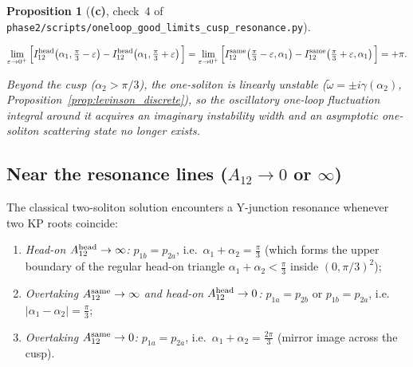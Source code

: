 \documentclass[11pt,a4paper]{article}
\newcommand{\Lc}{\textsf{\textbf{(c)}}}
\newcommand{\script}[1]{\texttt{phase2/\allowbreak scripts/\allowbreak #1}}
\newtheorem{proposition}{Proposition}[section]
\theoremstyle{remark}
\begin{document}
\begin{proposition}[\Lc, check~4 of \script{oneloop\_good\_limits\_cusp\_resonance.py}]
\begin{enumerate}
\begin{itemize}
\begin{equation}\label{eq:cusp_jump}
\lim_{\varepsilon\to 0^+}\Big[I_{12}^{\rm head}\!\left(\alpha_1,\tfrac{\pi}{3}-\varepsilon\right)-I_{12}^{\rm head}\!\left(\alpha_1,\tfrac{\pi}{3}+\varepsilon\right)\Big]
=\lim_{\varepsilon\to 0^+}\Big[I_{12}^{\rm same}\!\left(\tfrac{\pi}{3}-\varepsilon,\alpha_1\right)-I_{12}^{\rm same}\!\left(\tfrac{\pi}{3}+\varepsilon,\alpha_1\right)\Big]=+\pi.
\end{equation}
\end{itemize}
Beyond the cusp ($\alpha_2>\pi/3$), the one-soliton is linearly unstable ($\tilde\omega=\pm i\gamma(\alpha_2)$, Proposition~\ref{prop:levinson_discrete}), so the oscillatory one-loop fluctuation integral around it acquires an imaginary instability width and an asymptotic one-soliton scattering state no longer exists.
\end{enumerate}
\end{proposition}

\subsection{Near the resonance lines ($A_{12}\to 0$ or $\infty$)}

The classical two-soliton solution encounters a Y-junction resonance whenever two KP roots coincide:
\begin{enumerate}
\item[(i)] \emph{Head-on $A_{12}^{\rm head}\to\infty$:} $p_{1b}=p_{2a}$, i.e.\ $\alpha_1+\alpha_2=\frac{\pi}{3}$ (which forms the upper boundary of the regular head-on triangle $\alpha_1+\alpha_2<\frac{\pi}{3}$ inside $(0,\pi/3)^2$);
\item[(ii)] \emph{Overtaking $A_{12}^{\rm same}\to\infty$ and head-on $A_{12}^{\rm head}\to 0$:} $p_{1a}=p_{2b}$ or $p_{1b}=p_{2a}$, i.e.\ $|\alpha_1-\alpha_2|=\frac{\pi}{3}$;
\item[(iii)] \emph{Overtaking $A_{12}^{\rm same}\to 0$:} $p_{1a}=p_{2a}$, i.e.\ $\alpha_1+\alpha_2=\frac{2\pi}{3}$ (mirror image across the cusp).
\end{enumerate}
\end{document}
